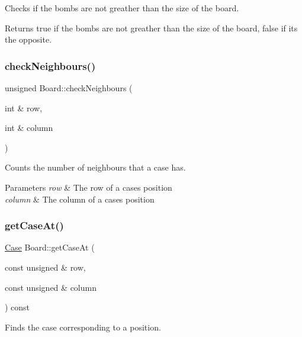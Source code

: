Checks if the bombs are not greather than the size of the board. 

\begin{DoxyReturn}{Returns}
true if the bombs are not greather than the size of the board, false if its the opposite. 
\end{DoxyReturn}
\mbox{\label{class_board_a607be54a79b42d895fe89e62b4f88577}} 
\subsubsection{\texorpdfstring{check\+Neighbours()}{checkNeighbours()}}
{\footnotesize\ttfamily unsigned Board\+::check\+Neighbours (\begin{DoxyParamCaption}\item[{int \&}]{row,  }\item[{int \&}]{column }\end{DoxyParamCaption})}



Counts the number of neighbours that a case has. 


\begin{DoxyParams}{Parameters}
{\em row} & The row of a case\textquotesingle{}s position \\
\hline
{\em column} & The column of a case\textquotesingle{}s position \\
\hline
\end{DoxyParams}
\mbox{\label{class_board_a24b99110a6a311dd122cabeeb63e81d8}} 
\subsubsection{\texorpdfstring{get\+Case\+At()}{getCaseAt()}}
{\footnotesize\ttfamily \hyperlink{class_case}{Case} Board\+::get\+Case\+At (\begin{DoxyParamCaption}\item[{const unsigned \&}]{row,  }\item[{const unsigned \&}]{column }\end{DoxyParamCaption}) const}



Finds the case corresponding to a position. 


